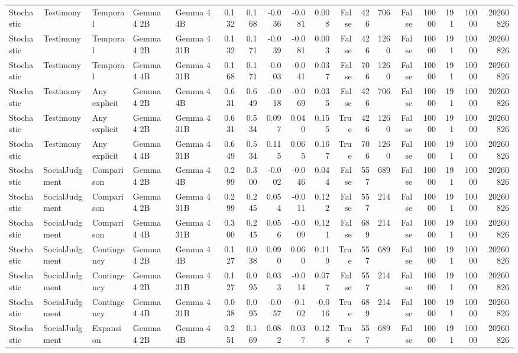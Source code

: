 \begin{tabular}{lllllrrrrrrrrrrrrr}
Stochastic & Testimony & Temporal & Gemma 4 2B & Gemma 4 4B & 0.132 & 0.168 & -0.036 & -0.081 & 0.008 & False & 426 & 706 & False & 10000 & 191 & 10000 & 20260826 \\
Stochastic & Testimony & Temporal & Gemma 4 2B & Gemma 4 31B & 0.132 & 0.171 & -0.039 & -0.081 & 0.003 & False & 426 & 1260 & False & 10000 & 191 & 10000 & 20260826 \\
Stochastic & Testimony & Temporal & Gemma 4 4B & Gemma 4 31B & 0.168 & 0.171 & -0.003 & -0.041 & 0.037 & False & 706 & 1260 & False & 10000 & 191 & 10000 & 20260826 \\
Stochastic & Testimony & Any explicit & Gemma 4 2B & Gemma 4 4B & 0.631 & 0.649 & -0.018 & -0.069 & 0.035 & False & 426 & 706 & False & 10000 & 191 & 10000 & 20260826 \\
Stochastic & Testimony & Any explicit & Gemma 4 2B & Gemma 4 31B & 0.631 & 0.534 & 0.097 & 0.040 & 0.155 & True & 426 & 1260 & False & 10000 & 191 & 10000 & 20260826 \\
Stochastic & Testimony & Any explicit & Gemma 4 4B & Gemma 4 31B & 0.649 & 0.534 & 0.115 & 0.065 & 0.167 & True & 706 & 1260 & False & 10000 & 191 & 10000 & 20260826 \\
Stochastic & SocialJudgment & Comparison & Gemma 4 2B & Gemma 4 4B & 0.299 & 0.300 & -0.002 & -0.046 & 0.044 & False & 557 & 689 & False & 10000 & 191 & 10000 & 20260826 \\
Stochastic & SocialJudgment & Comparison & Gemma 4 2B & Gemma 4 31B & 0.299 & 0.245 & 0.054 & -0.011 & 0.122 & False & 557 & 214 & False & 10000 & 191 & 10000 & 20260826 \\
Stochastic & SocialJudgment & Comparison & Gemma 4 4B & Gemma 4 31B & 0.300 & 0.245 & 0.056 & -0.009 & 0.121 & False & 689 & 214 & False & 10000 & 191 & 10000 & 20260826 \\
Stochastic & SocialJudgment & Contingency & Gemma 4 2B & Gemma 4 4B & 0.127 & 0.038 & 0.090 & 0.060 & 0.119 & True & 557 & 689 & False & 10000 & 191 & 10000 & 20260826 \\
Stochastic & SocialJudgment & Contingency & Gemma 4 2B & Gemma 4 31B & 0.127 & 0.095 & 0.033 & -0.014 & 0.077 & False & 557 & 214 & False & 10000 & 191 & 10000 & 20260826 \\
Stochastic & SocialJudgment & Contingency & Gemma 4 4B & Gemma 4 31B & 0.038 & 0.095 & -0.057 & -0.102 & -0.016 & True & 689 & 214 & False & 10000 & 191 & 10000 & 20260826 \\
Stochastic & SocialJudgment & Expansion & Gemma 4 2B & Gemma 4 4B & 0.251 & 0.169 & 0.082 & 0.037 & 0.128 & True & 557 & 689 & False & 10000 & 191 & 10000 & 20260826 \\

\end{tabular}
